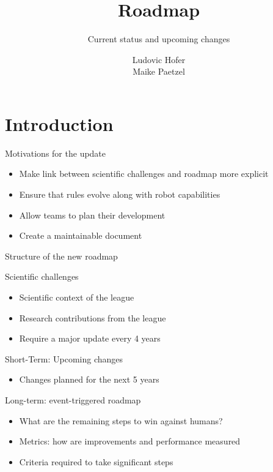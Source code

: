 \documentclass[xcolor=dvipsnames]{beamer}
\title{Roadmap}
\subtitle{Current status and upcoming changes}
\author[L. Hofer \& M. Paetzel]{Ludovic Hofer\\Maike Paetzel}
\institute{Institute}
\begin{document}
\begin{frame}[plain]
  \maketitle
\end{frame}


\section{Introduction}

\begin{frame}{Motivations for the update}
  \begin{itemize}
  \item Make link between scientific challenges and roadmap more explicit
  \item Ensure that rules evolve along with robot capabilities
  \item Allow teams to plan their development 
  \item Create a maintainable document
  \end{itemize}
\end{frame}

\begin{frame}{Structure of the new roadmap}
  \begin{block}{Scientific challenges}
    \begin{itemize}
    \item Scientific context of the league
    \item Research contributions from the league
    \item Require a major update every 4 years
    \end{itemize}
  \end{block}
  \begin{block}{Short-Term: Upcoming changes}
    \begin{itemize}
    \item Changes planned for the next 5 years
    \end{itemize}
  \end{block}
  \begin{block}{Long-term: event-triggered roadmap}
    \begin{itemize}
    \item What are the remaining steps to win against humans?
    \item Metrics: how are improvements and performance measured
    \item Criteria required to take significant steps
    \end{itemize}
  \end{block}
\end{frame}
\end{document}
